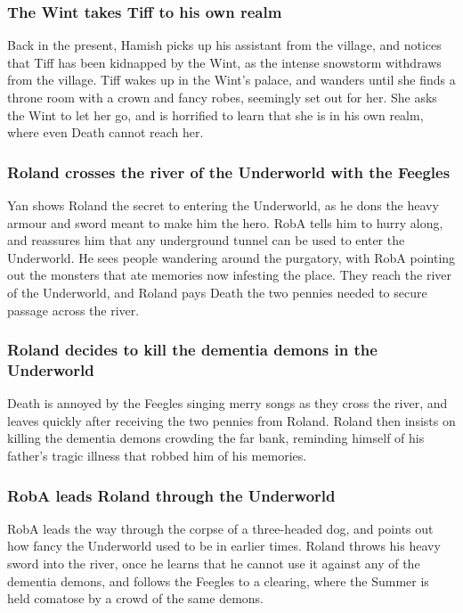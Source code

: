 \subsubsection{The \Gls{Wint} takes \Gls{Tiff} to his own realm}
Back in the present, \Gls{Hamish} picks up his assistant from the village, and notices that
\Gls{Tiff} has been kidnapped by the \Gls{Wint}, as the intense snowstorm withdraws from the
village. \Gls{Tiff} wakes up in the \Gls{Wint}'s palace, and wanders until she finds a throne
room with a crown and fancy robes, seemingly set out for her. She asks the \Gls{Wint} to let her go,
and is horrified to learn that she is in his own realm, where even \Gls{Death} cannot reach her.

\subsubsection{\Gls{Roland} crosses the river of the Underworld with the Feegles}
\Gls{Yan} shows \Gls{Roland} the secret to entering the Underworld, as he dons the heavy armour
and sword meant to make him the hero. \Gls{RobA} tells him to hurry along, and reassures him that
any underground tunnel can be used to enter the Underworld. He sees people wandering around the
purgatory, with \Gls{RobA} pointing out the monsters that ate memories now infesting the place. They
reach the river of the Underworld, and \Gls{Roland} pays \Gls{Death} the two pennies needed to
secure passage across the river.

\subsubsection{\Gls{Roland} decides to kill the dementia demons in the Underworld}
\Gls{Death} is annoyed by the Feegles singing merry songs as they cross the river, and leaves
quickly after receiving the two pennies from \Gls{Roland}. \Gls{Roland} then insists on killing the
dementia demons crowding the far bank, reminding himself of his father's tragic illness that robbed
him of his memories.

\subsubsection{\Gls{RobA} leads \Gls{Roland} through the Underworld}
\Gls{RobA} leads the way through the corpse of a three-headed dog, and points out how fancy the
Underworld used to be in earlier times. \Gls{Roland} throws his heavy sword into the river, once he
learns that he cannot use it against any of the dementia demons, and follows the Feegles to a
clearing, where the \Gls{Summer} is held comatose by a crowd of the same demons.

